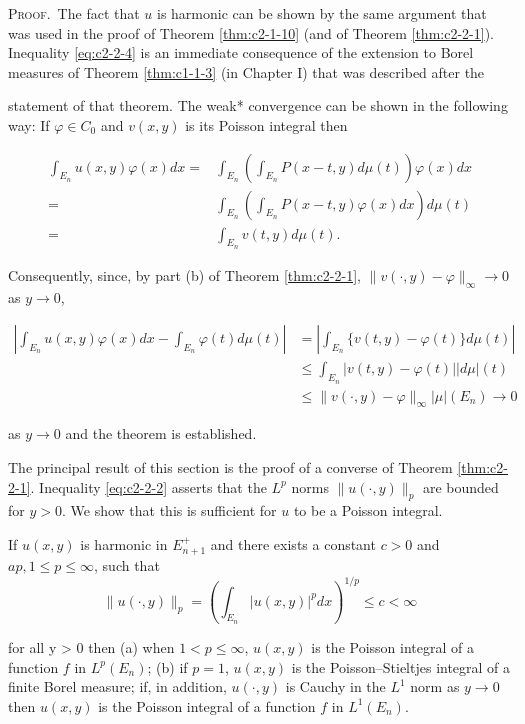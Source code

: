 \textsc{Proof.}\ The fact that $u$ is harmonic can be shown by the same argument that was used in the proof of Theorem \ref{thm:c2-1-10} (and of Theorem \ref{thm:c2-2-1}). Inequality \eqref{eq:c2-2-4} is an immediate consequence of the extension to Borel measures of Theorem \ref{thm:c1-1-3} (in Chapter I) that was described after the

statement of that theorem. The weak* convergence can be shown in the following way: If $\varphi \in C_0$ and $v(x, y)$ is its Poisson integral then

\[
\begin{aligned}\int_{E_{n}}u(x,y)\varphi(x)dx=&\int_{E_{n}}\left(\int_{E_{n}}P(x-t,y)d\mu(t)\right)\varphi(x)dx\\=&\int_{E_{n}}\left(\int_{E_{n}}P(x-t,y)\varphi(x)dx\right)d\mu(t)\\=&\int_{E_{n}}v(t,y)d\mu(t).\end{aligned}
\]

Consequently, since, by part (b) of Theorem \ref{thm:c2-2-1}, $\|v(\cdot, y) - \varphi\|_\infty \to 0$ as $y \to 0$,

\[
\begin{aligned}\left|\int_{E_{n}}u(x,y)\varphi(x)dx-\int_{E_{n}}\varphi(t)d\mu(t)\right|&=\left|\int_{E_{n}}\{v(t,y)-\varphi(t)\}d\mu(t)\right|\\&\leq\int_{E_{n}}|v(t,y)-\varphi(t)||d\mu|(t)\\&\leq\|v(\cdot,y)-\varphi\|_{\infty}|\mu|(E_{n})\to0\end{aligned}
\]

as $y \to 0$ and the theorem is established.

The principal result of this section is the proof of a converse of Theorem \ref{thm:c2-2-1}. Inequality \eqref{eq:c2-2-2} asserts that the $L^p$ norms $\|u(\cdot, y)\|_p$ are bounded for $y > 0$. We show that this is sufficient for $u$ to be a Poisson integral.

\begin{theorem}
\label{thm:c2-2-5}
If $u(x, y)$ is harmonic in $E_{n+1}^+$ and there exists a constant $c > 0$ and $a p, 1 \leq p \leq \infty$, such that
\[
\|u(\cdot,y)\|_{p}=\left(\int_{E_{n}}|u(x,y)|^{p}d x\right)^{1/p}\leq c<\infty
\]

for all y > 0 then
(a) when $1 < p \leq \infty$, $u(x, y)$ is the Poisson integral of a function $f$ in $L^p(E_n)$;
(b) if $p = 1$, $u(x, y)$ is the Poisson--Stieltjes integral of a finite Borel measure; if, in addition, $u(\cdot, y)$ is Cauchy in the $L^1$ norm as $y \to 0$ then $u(x, y)$ is the Poisson integral of a function $f$ in $L^1(E_n)$.
\end{theorem}

